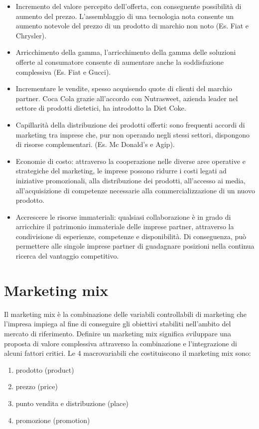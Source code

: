 \begin{itemize}
	\item Incremento del valore percepito dell’offerta, con conseguente possibilità di	aumento del prezzo. L’assemblaggio di una tecnologia nota consente un aumento notevole del prezzo di un prodotto di marchio non noto (Es. Fiat e Chrysler).
	\item Arricchimento della gamma, l’arricchimento della gamma delle soluzioni offerte al consumatore consente di aumentare anche la soddisfazione complessiva (Es. Fiat e Gucci).
	\item Incrementare le vendite, spesso acquisendo quote di clienti del marchio partner. Coca Cola grazie all’accordo con Nutrasweet, azienda leader nel settore di prodotti dietetici, ha introdotto la Diet Coke.
	\item Capillarità della distribuzione dei prodotti offerti: sono frequenti accordi di marketing tra imprese che, pur non operando negli stessi settori, dispongono di risorse complementari. (Es. Mc Donald’s e Agip).
	\item Economie di costo: attraverso la cooperazione nelle diverse aree operative e strategiche del marketing, le imprese possono ridurre i costi legati ad iniziative promozionali, alla distribuzione dei prodotti, all’accesso ai media, all’acquisizione di competenze necessarie alla commercializzazione di un nuovo prodotto.
	\item Accrescere le risorse immateriali: qualsiasi collaborazione è in grado di arricchire il patrimonio immateriale delle imprese partner, attraverso la condivisione di esperienze, competenze e disponibilità. Di conseguenza, può permettere alle singole imprese partner di guadagnare posizioni nella continua ricerca del vantaggio competitivo.
\end{itemize}
\chapter{Marketing mix}
Il marketing mix è la combinazione delle variabili controllabili di marketing che l’impresa impiega al fine di conseguire gli obiettivi stabiliti nell’ambito del mercato di riferimento. Definire un marketing mix significa sviluppare una proposta di valore complessiva attraverso la combinazione e l’integrazione di alcuni fattori critici. \newline
Le 4 macrovariabili che costituiscono il marketing mix sono:
\begin{enumerate}
	\item prodotto (product)
	\item prezzo (price)
	\item punto vendita e distribuzione (place)
	\item promozione (promotion)
\end{enumerate}


